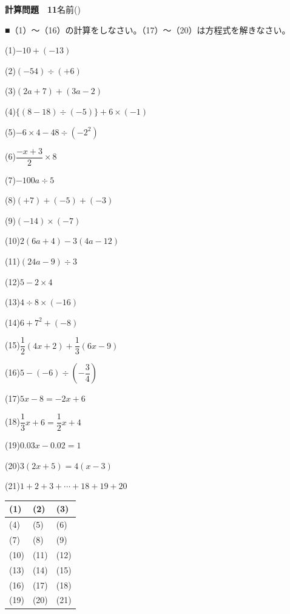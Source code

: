 \documentclass[a4paper,11pt]{ltjsarticle}
\newlength{\qcol}\setlength{\qcol}{0.47\textwidth}
\newlength{\qgap}
\newlength{\anscolw}\setlength{\anscolw}{0.30\textwidth}
\newlength{\ansh}
\newcommand{\Q}[2]{\parbox[t]{\qcol}{\raggedright (#1)\hspace{0.6em}$\displaystyle #2$}}
\newcommand{\QR}[4]{\Q{#1}{#2}\hfill\Q{#3}{#4}\par\vspace{\qgap}}
\newcommand{\anscell}[1]{\rule[-\ansdrop]{0pt}{\ansh}(#1)}
\newlength{\ansdrop}
\begin{document}
{\large\bfseries 計算問題　11}\hfill 名前(\underline{\hspace{32mm}})\par\vspace{3mm}
■（1）〜（16）の計算をしなさい。（17）〜（20）は方程式を解きなさい。\par\vspace{3mm}
\setlength{\qgap}{5.4mm}
\QR{1}{-10+(-13)}{2}{(-54)\div(+6)}
\QR{3}{(2a+7)+(3a-2)}{4}{\{(8-18)\div(-5)\}+6\times(-1)}
\QR{5}{-6\times4-48\div(-2^2)}{6}{\dfrac{-x+3}{2}\times8}
\QR{7}{-100a\div5}{8}{(+7)+(-5)+(-3)}
\QR{9}{(-14)\times(-7)}{10}{2(6a+4)-3(4a-12)}
\QR{11}{(24a-9)\div3}{12}{5-2\times4}
\QR{13}{4\div8\times(-16)}{14}{6+7^2+(-8)}
\QR{15}{\dfrac{1}{2}(4x+2)+\dfrac{1}{3}(6x-9)}{16}{5-(-6)\div\left(-\dfrac{3}{4}\right)}
\QR{17}{5x-8=-2x+6}{18}{\dfrac{1}{3}x+6=\dfrac{1}{2}x+4}
\QR{19}{0.03x-0.02=1}{20}{3(2x+5)=4(x-3)}
\vspace{1mm}
\Q{21}{1+2+3+\cdots+18+19+20}\par\vspace{3mm}
\setlength{\ansh}{9.5mm}\setlength{\ansdrop}{6mm}%
\begin{center}\begin{tabular}{|p{\anscolw}|p{\anscolw}|p{\anscolw}|}\hline
\anscell{1} & \anscell{2} & \anscell{3} \\\hline
\anscell{4} & \anscell{5} & \anscell{6} \\\hline
\anscell{7} & \anscell{8} & \anscell{9} \\\hline
\anscell{10} & \anscell{11} & \anscell{12} \\\hline
\anscell{13} & \anscell{14} & \anscell{15} \\\hline
\anscell{16} & \anscell{17} & \anscell{18} \\\hline
\anscell{19} & \anscell{20} & \anscell{21} \\\hline
\end{tabular}\end{center}
\end{document}
